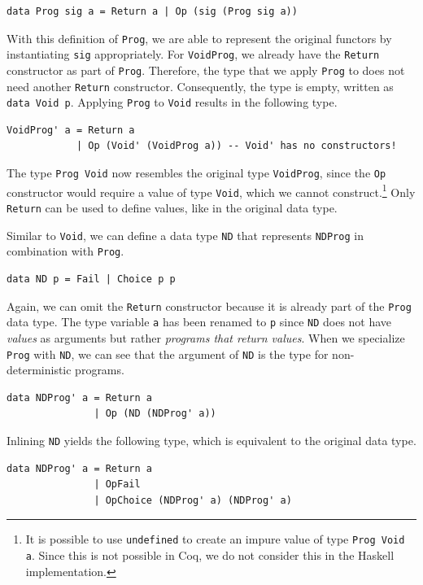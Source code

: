 \documentclass[a4paper, 11pt, fleqn, twoside, abstract=on]{scrreprt}
\newcommand{\hinl}[1]{\texttt{#1}}
\newcommand{\cinl}[1]{\texttt{#1}}
\begin{document}
\begin{verbatim}
data Prog sig a = Return a | Op (sig (Prog sig a))
\end{verbatim}
\noindent
With this definition of \hinl{Prog}, we are able to represent the original functors by instantiating \hinl{sig} appropriately.
For \hinl{VoidProg}, we already have the \hinl{Return} constructor as part of \hinl{Prog}.
Therefore, the type that we apply \hinl{Prog} to does not need another \hinl{Return} constructor.
Consequently, the type is empty, written as \hinl{data Void p}.
Applying \cinl{Prog} to \cinl{Void} results in the following type.

\begin{verbatim}
VoidProg' a = Return a
            | Op (Void' (VoidProg a)) -- Void' has no constructors!
\end{verbatim}

The type \hinl{Prog Void} now resembles the original type \hinl{VoidProg}, since the \hinl{Op} constructor would require a value of type \hinl{Void}, which we cannot construct.\footnote{It is possible to use \texttt{undefined} to create an impure value of type \texttt{Prog Void a}.
Since this is not possible in Coq, we do not consider this in the Haskell implementation.}
Only \hinl{Return} can be used to define values, like in the  original data type.

Similar to \hinl{Void}, we can define a data type \hinl{ND} that represents \hinl{NDProg} in combination with \hinl{Prog}.

\label{min:ND}
\begin{verbatim}
data ND p = Fail | Choice p p
\end{verbatim}
\noindent
Again, we can omit the \hinl{Return} constructor because it is  already part of the \hinl{Prog} data type.
The type variable \hinl{a} has been renamed to \hinl{p} since \hinl{ND} does not have \textit{values} as arguments but rather \textit{programs that return values}.
When we specialize \hinl{Prog} with \hinl{ND}, we can see that the argument of \hinl{ND} is the type for non-deterministic programs.

\begin{verbatim}
data NDProg' a = Return a
               | Op (ND (NDProg' a))
\end{verbatim}
\noindent
Inlining \hinl{ND} yields the following type, which is equivalent to the original data type.

\begin{verbatim}
data NDProg' a = Return a
               | OpFail
               | OpChoice (NDProg' a) (NDProg' a)
\end{verbatim}
\end{document}
